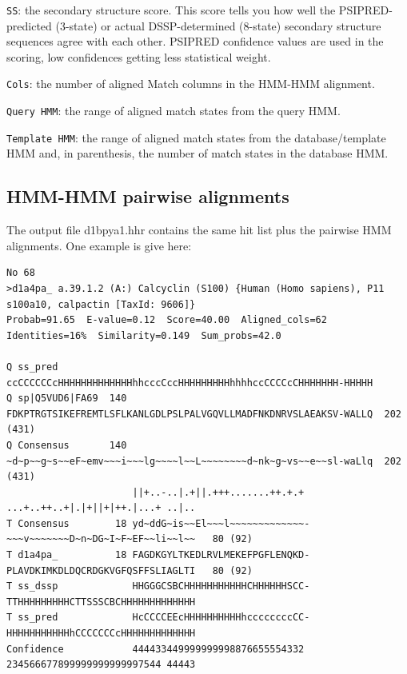 \documentclass[11pt,a4paper]{article}
\begin{document}
\begin{description}
\item{\verb`SS`}: the secondary structure score.
This score tells you how well the PSIPRED-predicted (3-state) or actual DSSP-determined 
(8-state) secondary structure sequences agree with each other. PSIPRED confidence 
values are used in the scoring, low confidences getting less statistical weight.

\item{\verb`Cols`}: the number of aligned Match columns in the HMM-HMM alignment.

\item{\verb`Query HMM`}: the range of aligned match states from the query HMM.

\item{\verb`Template HMM`}: the range of aligned match states from the database/template HMM and, 
in parenthesis, the number of match states in the database HMM.

\end{description}



\subsection{HMM-HMM pairwise alignments}\label{aliblocksformat}

The output file d1bpya1.hhr contains the same hit list plus the pairwise HMM alignments. One example is give here:

\scriptsize
\begin{verbatim}
No 68 
>d1a4pa_ a.39.1.2 (A:) Calcyclin (S100) {Human (Homo sapiens), P11 s100a10, calpactin [TaxId: 9606]}
Probab=91.65  E-value=0.12  Score=40.00  Aligned_cols=62  Identities=16%  Similarity=0.149  Sum_probs=42.0

Q ss_pred             ccCCCCCCcHHHHHHHHHHHHHhhcccCccHHHHHHHHHhhhhccCCCCcCHHHHHHH-HHHHH
Q sp|Q5VUD6|FA69  140 FDKPTRGTSIKEFREMTLSFLKANLGDLPSLPALVGQVLLMADFNKDNRVSLAEAKSV-WALLQ  202 (431)
Q Consensus       140 ~d~p~~g~s~~eF~emv~~~i~~~lg~~~~l~~L~~~~~~~~d~nk~g~vs~~e~~sl-waLlq  202 (431)
                      ||+..-..|.+||.+++.......++.+.+ ...+..++..+|.|+||+|++.|...+ ..|..
T Consensus        18 yd~ddG~is~~El~~~l~~~~~~~~~~~~~-~~~v~~~~~~~D~n~DG~I~F~EF~~li~~l~~   80 (92)
T d1a4pa_          18 FAGDKGYLTKEDLRVLMEKEFPGFLENQKD-PLAVDKIMKDLDQCRDGKVGFQSFFSLIAGLTI   80 (92)
T ss_dssp             HHGGGCSBCHHHHHHHHHHHCHHHHHHSCC-TTHHHHHHHHHCTTSSSCBCHHHHHHHHHHHHH
T ss_pred             HcCCCCEEcHHHHHHHHHHhccccccccCC-HHHHHHHHHHHhCCCCCCCcHHHHHHHHHHHHH
Confidence            444433449999999998876655554332 234566677899999999999997544 44443
\end{verbatim}\normalsize
\end{document}
